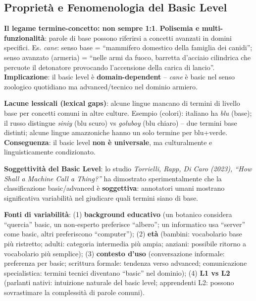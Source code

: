 \documentclass[12pt,a4paper]{article}
\begin{document}
\subsection{Propriet\`a e Fenomenologia del Basic Level}

\textbf{Il legame termine-concetto: non sempre 1:1}. \textbf{Polisemia e multi-funzionalit\`a}: parole di base possono riferirsi a concetti avanzati in domini specifici. Es. \textit{cane}: senso base = ``mammifero domestico della famiglia dei canidi''; senso avanzato (armeria) = ``nelle armi da fuoco, barretta d'acciaio cilindrica che percuote il detonatore provocando l'accensione della carica di lancio''. \textbf{Implicazione}: il basic level \`e \textbf{domain-dependent} -- \textit{cane} \`e basic nel senso zoologico quotidiano ma advanced/tecnico nel dominio armiero.

\textbf{Lacune lessicali (lexical gaps)}: alcune lingue mancano di termini di livello base per concetti comuni in altre culture. Esempio (colori): italiano ha \textit{blu} (base); il russo distingue \textit{siniy} (blu scuro) vs \textit{goluboy} (blu chiaro) -- due termini base distinti; alcune lingue amazzoniche hanno un solo termine per blu+verde. \textbf{Conseguenza}: il basic level \textbf{non \`e universale}, ma culturalmente e linguisticamente condizionato.

\begin{quizbox}
\textbf{Soggettivit\`a del Basic Level}: lo studio \emph{Torrielli, Rapp, Di Caro (2023), ``How Shall a Machine Call a Thing?''} ha dimostrato sperimentalmente che la classificazione basic/advanced \`e \textbf{soggettiva}: annotatori umani mostrano significativa variabilit\`a nel giudicare quali termini siano di base.
\end{quizbox}

\textbf{Fonti di variabilit\`a}: (1) \textbf{background educativo} (un botanico considera ``quercia'' basic, un non-esperto preferisce ``albero''; un informatico usa ``server'' come basic, altri preferiscono ``computer''); (2) \textbf{et\`a} (bambini: vocabolario base pi\`u ristretto; adulti: categoria intermedia pi\`u ampia; anziani: possibile ritorno a vocabolario pi\`u semplice); (3) \textbf{contesto d'uso} (conversazione informale: preferenza per basic; scrittura formale: tendenza verso advanced; comunicazione specialistica: termini tecnici diventano ``basic'' nel dominio); (4) \textbf{L1 vs L2} (parlanti nativi: intuizione naturale del basic level; apprendenti L2: possono sovrastimare la complessit\`a di parole comuni).
\end{document}

